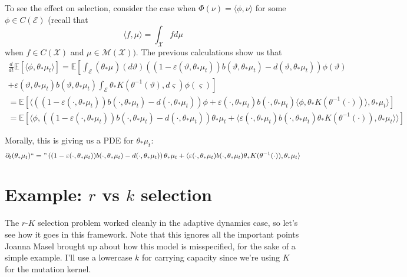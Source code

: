 \documentclass[11pt]{amsart}
\theoremstyle{remark}
\theoremstyle{definition}
\begin{document}
To see the effect on selection, consider the case when $\Phi(\nu) = \langle \phi, \nu \rangle$ for some $\phi \in C(\mathcal{E})$ (recall that
\[
	\langle f, \mu \rangle = \int_{\mathcal{X}} f d\mu
\]
when $f \in C(\mathcal{X})$ and $\mu \in \mathcal{M}(\mathcal{X}))$.  The previous calculations show us that 
\begin{multline*}
	\frac{d}{dt} \mathbb{E}[\langle \phi, \theta_{*}\mu_{t} \rangle] 
	= \mathbb{E}\left[\int_{\mathcal{E}} (\theta_{*}\mu_{})(d\vartheta) 
	\left((1-\varepsilon(\vartheta,\theta_{*}\mu_{t})) b(\vartheta,\theta_{*}\mu_{t})- d(\vartheta,\theta_{*}\mu_{t})\right)\phi(\vartheta)\right.\\
	\left.+ \varepsilon(\vartheta,\theta_{*}\mu_{t}) b(\vartheta,\theta_{*}\mu_{t})
		\int_{\mathcal{E}} \theta_{*}K(\theta^{-1}(\vartheta),d\varsigma)\phi(\varsigma)\right]\\
	= \mathbb{E}\left[\langle \left((1-\varepsilon(\cdot,\theta_{*}\mu_{t})) b(\cdot,\theta_{*}\mu_{t})
		- d(\cdot,\theta_{*}\mu_{t})\right)\phi 
		+ \varepsilon(\cdot,\theta_{*}\mu_{t}) b(\cdot,\theta_{*}\mu_{t})\langle \phi, \theta_{*}K(\theta^{-1}(\cdot)) \rangle, \theta_{*}\mu_{t} \rangle 
		\right] \\
	= \mathbb{E}\left[\langle \phi, \left((1-\varepsilon(\cdot,\theta_{*}\mu_{t})) b(\cdot,\theta_{*}\mu_{t})
		- d(\cdot,\theta_{*}\mu_{t}) \right) \theta_{*}\mu_{t}
		+ \langle  \varepsilon(\cdot,\theta_{*}\mu_{t}) b(\cdot,\theta_{*}\mu_{t}) \theta_{*}K(\theta^{-1}(\cdot)),\theta_{*}\mu_{t}\rangle \rangle\right]
\end{multline*}

Morally, this is giving us a PDE for $\theta_{*}\mu_{t}$:
\[
	\partial_{t} (\theta_{*}\mu_{t}) ``=\text{''} \left((1-\varepsilon(\cdot,\theta_{*}\mu_{t})) b(\cdot,\theta_{*}\mu_{t})
		- d(\cdot,\theta_{*}\mu_{t}) \right) \theta_{*}\mu_{t}
		+ \langle  \varepsilon(\cdot,\theta_{*}\mu_{t}) b(\cdot,\theta_{*}\mu_{t}) \theta_{*}K(\theta^{-1}(\cdot)),\theta_{*}\mu_{t}\rangle
\]


\section*{Example: $r$ vs $k$ selection}

The $r$-$K$ selection problem worked cleanly in the adaptive dynamics
case, so let's see how it goes in this framework.
Note that this ignores all the important points Joanna Masel brought up
about how this model is misspecified,
for the sake of a simple example.
I'll use a lowercase $k$ for carrying capacity since we're using $K$ for
the mutation kernel.
\end{document}
